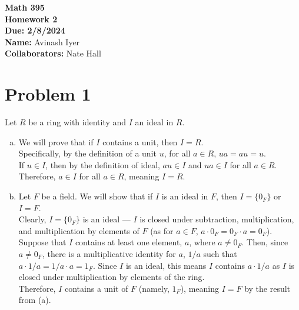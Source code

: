 \documentclass[10pt]{extarticle}
\title{}
\author{}
\date{}
\begin{document}
  \begin{center}
    {\bf \Large Math 395 \\[0.1in]Homework 2 \\[0.1in]
    Due: 2/8/2024}\\[.25in]
    {\bf Name:} {Avinash Iyer}\\[0.15in]
    {\bf Collaborators:} {Nate Hall} \\
  \end{center}
  \section{Problem 1}%
  Let $R$ be a ring with identity and $I$ an ideal in $R$.
  \begin{enumerate}[(a)]
    \item We will prove that if $I$ contains a unit, then $I = R$.\\

      Specifically, by the definition of a unit $u$, for all $a\in R$, $ua = au = u$.\\

      If $u\in I$, then by the definition of ideal, $au\in I$ and $ua \in I$ for all $a\in R$. Therefore, $a\in I$ for all $a\in R$, meaning $I = R$.
    \item Let $F$ be a field. We will show that if $I$ is an ideal in $F$, then $I = \{0_F\}$ or $I = F$.\\

      Clearly, $I = \{0_F\}$ is an ideal --- $I$ is closed under subtraction, multiplication, and multiplication by elements of $F$ (as for $a\in F$, $a\cdot 0_F = 0_F \cdot a = 0_F$).\\

      Suppose that $I$ contains at least one element, $a$, where $a\neq 0_F$. Then, since $a \neq 0_F$, there is a multiplicative identity for $a$, $1/a$ such that $a\cdot 1/a = 1/a \cdot a = 1_F$. Since $I$ is an ideal, this means $I$ contains $a \cdot 1/a$ as $I$ is closed under multiplication by elements of the ring.\\

      Therefore, $I$ contains a unit of $F$ (namely, $1_F$), meaning $I = F$ by the result from (a).
  \end{enumerate}
\end{document}
